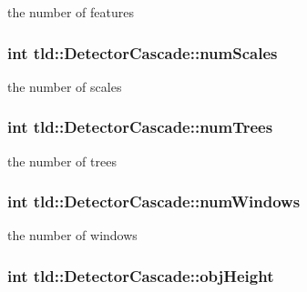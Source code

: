 the number of features 

\hypertarget{classtld_1_1DetectorCascade_a340c7a6c9aadf1d08af297c77e2ee857}{
\subsubsection[{num\-Scales}]{\setlength{\rightskip}{0pt plus 5cm}int tld\-::\-Detector\-Cascade\-::num\-Scales\hspace{0.3cm}{\ttfamily [private]}}}\label{classtld_1_1DetectorCascade_a340c7a6c9aadf1d08af297c77e2ee857}


the number of scales 

\hypertarget{classtld_1_1DetectorCascade_a2d41ea56f304562878151ae09c34aa8f}{
\subsubsection[{num\-Trees}]{\setlength{\rightskip}{0pt plus 5cm}int tld\-::\-Detector\-Cascade\-::num\-Trees}}\label{classtld_1_1DetectorCascade_a2d41ea56f304562878151ae09c34aa8f}


the number of trees 

\hypertarget{classtld_1_1DetectorCascade_a700932efdadfdd218697b56aa7703b4b}{
\subsubsection[{num\-Windows}]{\setlength{\rightskip}{0pt plus 5cm}int tld\-::\-Detector\-Cascade\-::num\-Windows}}\label{classtld_1_1DetectorCascade_a700932efdadfdd218697b56aa7703b4b}


the number of windows 

\hypertarget{classtld_1_1DetectorCascade_a1186ed695cf6e9f00d180ec92e4aa1ea}{
\subsubsection[{obj\-Height}]{\setlength{\rightskip}{0pt plus 5cm}int tld\-::\-Detector\-Cascade\-::obj\-Height}}\label{classtld_1_1DetectorCascade_a1186ed695cf6e9f00d180ec92e4aa1ea}


